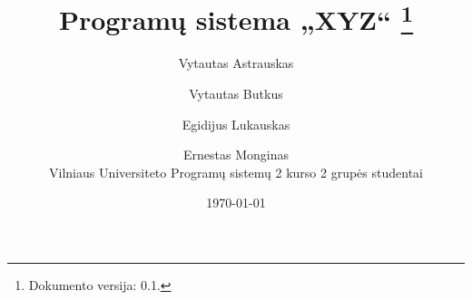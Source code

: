 \documentclass{report}
\title{%
Programų sistema „XYZ“
\thanks{Dokumento versija: 0.1.}
}
\author{%
Vytautas Astrauskas \and Vytautas Butkus \and%
Egidijus Lukauskas \and Ernestas Monginas \\
Vilniaus Universiteto Programų sistemų 2 kurso 2 grupės studentai
}
\date{\today}
\begin{document}
\maketitle
\bigskip
\tableofcontents
\end{document}
